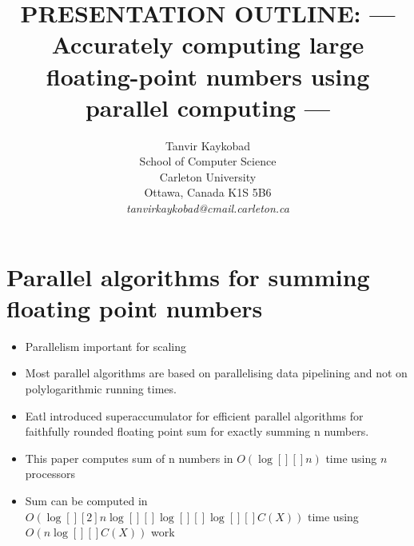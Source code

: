 \documentclass[11pt]{article}       %
\newenvironment{slide}[1]        {\section{#1} \begin{itemize}}%
                                 {\end{itemize}}
\begin{document}

\title{PRESENTATION OUTLINE: --- Accurately computing large floating-point numbers using parallel computing ---}


\author{
Tanvir Kaykobad\\
School of Computer Science\\
Carleton University\\
Ottawa, Canada K1S 5B6\\
{\em tanvirkaykobad@cmail.carleton.ca}
} %

\maketitle

\begin{slide}{Parallel algorithms for summing floating point numbers}
\item Parallelism important for scaling
\item Most parallel algorithms are based on parallelising data pipelining and not on polylogarithmic running times.
\item Eatl introduced superaccumulator for efficient parallel algorithms for faithfully rounded floating point sum for exactly summing n numbers.

\item This paper computes sum of n numbers in $O(\log[][] {n})$ time using $n$ processors 
\item Sum can be computed in $O(\log[][2]{n}\log[][]{}\log[][]{}\log[][]{}C(X))$ time using $O(n\log[][]{}C(X))$ work
\end {slide}




\end{document}
